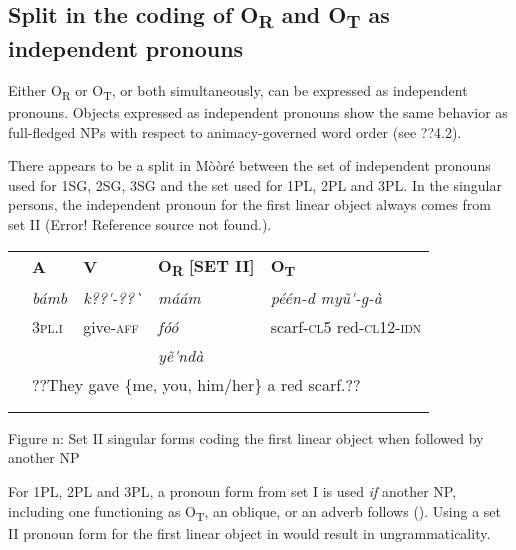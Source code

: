 \documentclass[output=paper]{langsci/langscibook}
\begin{document}
\subsection{Split in the coding of O\textsubscript{R} and O\textsubscript{T} as independent pronouns}

Either O\textsubscript{R} or O\textsubscript{T}, or both simultaneously, can be expressed as independent pronouns. Objects expressed as independent pronouns show the same behavior as full-fledged NPs with respect to animacy-governed word order (see ??4.2). 

There appears to be a split in Mòòré between the set of independent pronouns used for 1SG, 2SG, 3SG and the set used for 1PL, 2PL and 3PL. In the singular persons, the independent pronoun for the first linear object always comes from set II (Error! Reference source not found.). 

\begin{tabularx}{\textwidth}{XXXXX} & \textbf{A} & \textbf{V} & \textbf{O}\textbf{\textsubscript{R}}\textbf{ [SET II]} & \textbf{O}\textbf{\textsubscript{T}}\\
\lsptoprule
& \textit{bámb} & \textit{k??\'{ }-??\`{ }} & \textit{máám} & \textit{péén-d      myũ\'{ }-g-à}\\
& 3\textsc{pl.i} & give-\textsc{aff} & \textit{fóó} & scarf-\textsc{cl5 } red-\textsc{cl12-idn}\\
&  &  & \textit{yẽ\'{ }ndà} & \\
& \multicolumn{4}{l}{??They gave \{me, you, him/her\} a red scarf.??}\\
& \multicolumn{4}{l}{}\\
\lspbottomrule
\end{tabularx}
\begin{table}\caption{
Figure n: Set II singular forms coding the first linear object when followed by another NP
}\end{table}

For 1PL, 2PL and 3PL, a pronoun form from set I is used \textit{if} another NP, including one functioning as O\textsubscript{T}, an oblique, or an adverb follows (). Using a set II pronoun form for the first linear object in  would result in ungrammaticality.
\end{document}
